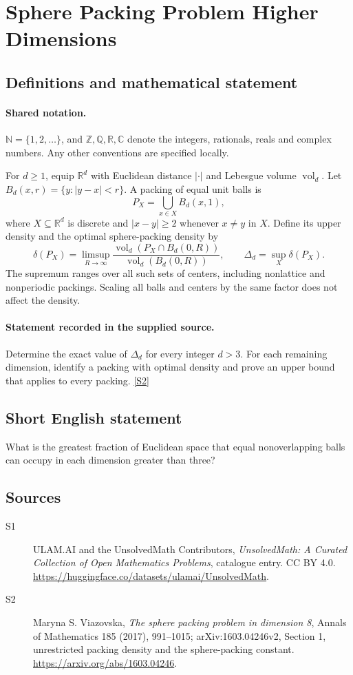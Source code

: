 \documentclass[11pt]{article}
\newcommand{\sref}[2]{\hyperlink{source:#1:#2}{[S#2]}}
\begin{document}
\section{Sphere Packing Problem Higher Dimensions}\label{statement}

\subsection{Definitions and mathematical statement}

\paragraph{Shared notation.}$\mathbb N=\{1,2,\ldots\}$, and $\mathbb Z,\mathbb Q,\mathbb R,\mathbb C$ denote the integers, rationals, reals and complex numbers. Any other conventions are specified locally.


For \(d\ge1\), equip \(\mathbb R^d\) with Euclidean distance
\(|\cdot|\) and Lebesgue volume \(\operatorname{vol}_d\).
Let \(B_d(x,r)=\{y:|y-x|<r\}\).
A packing of equal unit balls is
\[
                P_X=\bigcup_{x\in X}B_d(x,1),
\]
where \(X\subseteq\mathbb R^d\) is discrete and
\(|x-y|\ge2\) whenever \(x\ne y\) in \(X\).
Define its upper density and the optimal sphere-packing density by
\[
 \delta(P_X)=\limsup_{R\to\infty}
     \frac{\operatorname{vol}_d(P_X\cap B_d(0,R))}
          {\operatorname{vol}_d(B_d(0,R))},
 \qquad \Delta_d=\sup_X\delta(P_X).
\]
The supremum ranges over all such sets of centers, including nonlattice
and nonperiodic packings. Scaling all balls and centers by the same factor
does not affect the density.
\paragraph{Statement recorded in the supplied source.}
Determine the exact value of \(\Delta_d\) for every integer \(d>3\).
For each remaining dimension, identify a packing with optimal density
and prove an upper bound that applies to every packing. \sref{statement}{2}
\subsection{Short English statement}
What is the greatest fraction of Euclidean space that equal nonoverlapping balls can occupy in each dimension greater than three?
\subsection{Sources}
\begin{description}
\item[\hypertarget{source:statement:1}{S1}] ULAM.AI and the UnsolvedMath Contributors, \emph{UnsolvedMath: A Curated Collection of Open Mathematics Problems}, catalogue entry. CC BY 4.0. \url{https://huggingface.co/datasets/ulamai/UnsolvedMath}.
\item[\hypertarget{source:statement:2}{S2}] Maryna S. Viazovska, \emph{The sphere packing problem in dimension 8}, Annals of Mathematics 185 (2017), 991--1015; arXiv:1603.04246v2, Section 1, unrestricted packing density and the sphere-packing constant. \url{https://arxiv.org/abs/1603.04246}.
\end{description}
\label{end:statement}
\end{document}
